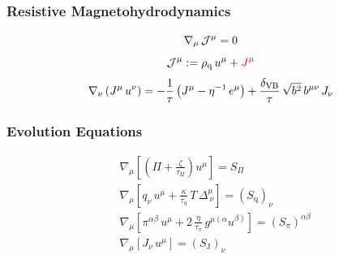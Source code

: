 \documentclass{beamer}
\begin{document}
\begin{frame}
\frametitle{Resistive Magnetohydrodynamics}

  \begin{equation}
    \nabla_{\mu} \, \mathcal{J}^{\mu} = 0
  \end{equation}
  \begin{equation}
    \mathcal{J}^{\mu} := \rho_{\mathrm{q}} \, u^{\mu} + \textcolor{red}{J^{\mu}}
  \end{equation}
  \begin{equation}
    \nabla_{\nu} \left( J^{\mu} \, u^{\nu} \right)
    = -\frac{1}{\tau} \left( J^{\mu} - \eta^{-1} \, e^{\mu} \right)
    + \frac{\delta_{\mathrm{VB}}}{\tau} \, \sqrt{b^{2}} \, b^{\mu\nu} \, J_{\nu}
  \end{equation}
\end{frame}

\begin{frame}
\frametitle{Evolution Equations}

  \begin{align}
    &\nabla_{\mu} \left[ \left( \Pi + \frac{\zeta}{\tau_{\Pi}} \right) u^{\mu} \right]
    = S_{\Pi} \\
    &\nabla_{\mu} \left[ q_{\nu} \, u^{\mu} + \frac{\kappa}{\tau_{\mathrm{q}}} \, T \, \Delta^{\mu}_{~\nu} \right]
    = \left(S_{\mathrm{q}}\right)_{\nu} \\
    &\nabla_{\mu} \left[ \pi^{\alpha\beta} \, u^{\mu}
    + 2 \, \frac{\eta}{\tau_{\pi}} \, g^{\mu\left(\alpha\right.}u^{\left.\beta\right)} \right]
    = \left(S_{\pi}\right)^{\alpha\beta} \\
    &\nabla_{\mu} \left[ J_{\nu} \, u^{\mu} \right]
    = \left(S_{\mathrm{J}}\right)_{\nu}
  \end{align}

\end{frame}
\end{document}
